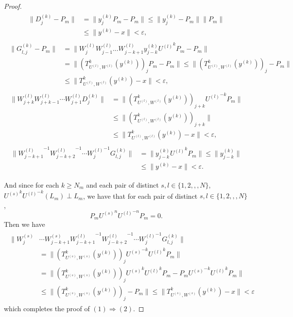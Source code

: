 \documentclass{article}
\begin{document}
\begin{proof}
	\begin{eqnarray}\begin{split}\nonumber
	\|D^{(k)}_{j}-P_{m}\|
	&=\|y^{(k)}_{j}P_{m}-P_{m}\|\leq \|y^{(k)}_{j}-P_{m}\|\|P_{m}\|
	\\
	&\leq\|y^{(k)}-x\|<\varepsilon,
	\end{split}\end{eqnarray}
	\begin{eqnarray}\begin{split}\nonumber
	\|G^{(k)}_{l,j}-P_{m}\|
	&=\|W^{(l)}_{j}W^{(l)}_{j-1}...W^{(l)}_{j-k+1}y^{(k)}_{j-k}{U^{(l)}}^{k}P_{m}-P_{m}\|
	\\
	&=\|(T^{k}_{U^{(l)},W^{(l)}}(y^{(k)}))_{j}P_{m}-P_{m}\|\leq \|(T^{k}_{U^{(l)},W^{(l)}}(y^{(k)}))_{j}-P_{m}\|
	\\
	&\leq\|T^{k}_{U^{(l)},W^{(l)}}(y^{(k)})-x\|<\varepsilon,
	\end{split}\end{eqnarray}
	\begin{eqnarray}\begin{split}\nonumber
	\|W^{(l)}_{j+k}W^{(l)}_{j+k-1}\cdots W^{(l)}_{j+1}D^{(k)}_{j}\|
	&=\|(T^{k}_{U^{(l)},W^{(l)}}(y^{(k)}))_{j+k}{U^{(l)}}^{-k}P_{m}\|
	\\
	&\leq\|(T^{k}_{U^{(l)},W^{(l)}}(y^{(k)}))_{j+k}\|
	\\
	&\leq\|T^{k}_{U^{(l)},W^{(l)}}(y^{(k)})-x\|<\varepsilon,
	\end{split}
	\end{eqnarray}
	\begin{eqnarray}\begin{split}\nonumber
	\|{W^{(l)}_{j-k+1}}^{-1}{W^{(l)}_{j-k+2}}^{-1}\cdots {W^{(l)}_{j}}^{-1}G^{(k)}_{l,j}\|
	&=\|y^{(k)}_{j-k}{U^{(l)}}^{k}P_{m}\|\leq\|y^{(k)}_{j-k}\|
	\\
	&\leq \|y^{(k)}-x\|<\varepsilon.
	\end{split}
	\end{eqnarray}
	
	And since for each $k\geq N_{m}$ and each pair of distinct $s,l\in \{1,2,,,N\}$,  ${U^{(s)}}^{k}{U^{(l)}}^{-k}(L_{m})\perp L_{m}$, we have that for each pair of distinct $s,l\in \{1,2,,,N\}$,
	\[P_{m}{U^{(s)}}^{n}{U^{(l)}}^{-n}P_{m}=0.\]
	Then we have 
	\begin{eqnarray}\begin{split}\nonumber
	\|W^{(s)}_{j}&\cdots W^{(s)}_{j-k+1}{W^{(l)}_{j-k+1}}^{-1}{W^{(l)}_{j-k+2}}^{-1}\cdots
	{W^{(l)}_{j}}^{-1}G^{(k)}_{l,j}\|
	\\
	&=\|(T^{k}_{U^{(s)},W^{(s)}}(y^{(k)}))_{j} {U^{(s)}}^{-k}{U^{(l)}}^{k}P_{m}\|
	\\
	&=\|(T^{k}_{U^{(s)},W^{(s)}}(y^{(k)}))_{j} {U^{(s)}}^{k}{U^{(l)}}^{k}P_{m}-P_{m}{U^{(s)}}^{-k}{U^{(l)}}^{k}P_{m}\|
	\\
	&\leq\|(T^{k}_{U^{(s)},W^{(s)}}(y^{(k)}))_{j}-P_{m}\|\leq \|T^{k}_{U^{(s)},W^{(s)}}(y^{(k)})-x\|<\varepsilon
	\end{split}
	\end{eqnarray}
	which completes the proof of $(1)\Rightarrow(2)$.
	

\end{proof}
\end{document}
